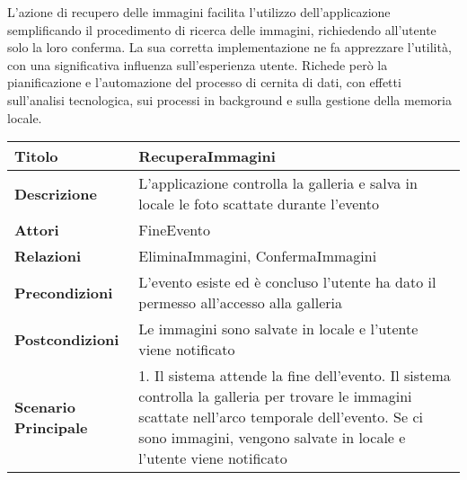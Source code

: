 L'azione di recupero delle immagini facilita l'utilizzo dell'applicazione semplificando il procedimento di ricerca delle immagini,
richiedendo all'utente solo la loro conferma.
La sua corretta implementazione ne fa apprezzare l'utilità, con una significativa influenza sull'esperienza utente.
Richede però la pianificazione e l'automazione del processo di cernita di dati,
con effetti sull'analisi tecnologica, sui processi in background e sulla gestione della memoria locale.\\
\begin{table}[htb]
    \begin{tabular} {|P{4.5cm}|P{11cm}|}
        \hline
        \textbf{Titolo}                   & RecuperaImmagini                                                                                                                           \\
        \hline
        \textbf{Descrizione}              & L'applicazione controlla la galleria e salva in locale le foto scattate durante l'evento                                                   \\
        \hline
        \textbf{Attori}                   & FineEvento                                                                                                                                 \\
        \hline
        \textbf{Relazioni}                & EliminaImmagini, ConfermaImmagini                                                                                                          \\
        \hline
        \textbf{Precondizioni}            & L'evento esiste ed è concluso\linebreak
        l'utente ha dato il permesso all'accesso alla galleria                                                                                                                         \\
        \hline
        \textbf{Postcondizioni}           & Le immagini sono salvate in locale e l'utente viene notificato                                                                             \\
        \hline
        \textbf{Scenario Principale}      & 1. Il sistema attende la fine dell'evento. Il sistema controlla la galleria per trovare le immagini scattate nell'arco temporale dell'evento. Se ci sono immagini, vengono salvate in locale e l'utente viene notificato                                                                                                  \\

\end{tabular}
\end{table}
